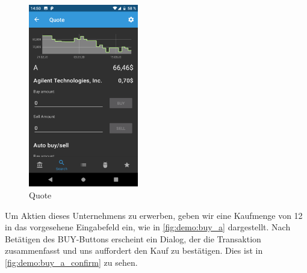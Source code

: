 \documentclass[a4paper]{article}
\begin{document}
\begin{figure}[H]
	\centering
	\includegraphics[height=8cm,keepaspectratio]{./images/demo/quote.png}
	\caption{Quote}
	\label{fig:demo:quote}
\end{figure}

Um Aktien dieses Unternehmens zu erwerben, geben wir eine Kaufmenge von 12 in das vorgesehene Eingabefeld ein, wie in \autoref{fig:demo:buy_a} dargestellt. Nach Betätigen des BUY-Buttons erscheint ein Dialog, der die Transaktion zusammenfasst und uns auffordert den Kauf zu bestätigen. Dies ist in \autoref{fig:demo:buy_a_confirm} zu sehen.
\end{document}
